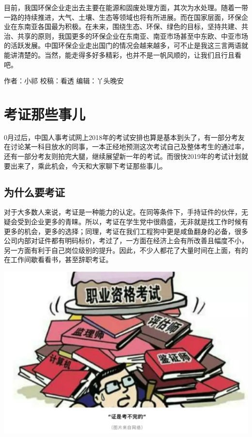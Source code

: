 \documentclass[]{book}
\begin{document}
目前，我国环保企业走出去主要在能源和固废处理方面，其次为水处理。随着一带一路的持续推进，大气、土壤、生态等领域也将有所进展。而在国家层面，环保企业在东南亚各国最为积极。在未来，围绕生态、环保、绿色的目标，坚持共建、共治、共享的原则，我国更多的环保企业在东南亚、南亚市场甚至中东欧、中亚市场的活跃发展。中国环保企业走出国门的情况会越来越多，可不止是我这三言两语就能讲清楚的。当然，能走得多好多精彩，也并不是一帆风顺的，让我们且行且看吧。

作者：小祁
校稿：看透
编辑：丫头晚安

\hypertarget{ux8003ux8bc1ux90a3ux4e9bux4e8bux513f}{%
\section{考证那些事儿}\label{ux8003ux8bc1ux90a3ux4e9bux4e8bux513f}}

0月过后，中国人事考试网上2018年的考试安排也算是基本到头了，有一部分考友在讨论某一科目放水的同事，一本正经地预测这次考试自己及整体考生的通过率，还有一部分考友则拍完大腿，继续展望新一年的考试。而很快2019年的考试计划就要出来了，乘此机会，今天和大家聊下考证那些事儿。

\hypertarget{ux4e3aux4ec0ux4e48ux8981ux8003ux8bc1}{%
\subsection{为什么要考证}\label{ux4e3aux4ec0ux4e48ux8981ux8003ux8bc1}}

对于大多数人来说，考证是一种能力的认定。在同等条件下，手持证件的伙伴，无疑会受到企业更多的青睐。所以，考证在学生党中很鼎盛，无非就是找工作时候有更多的机会，更多的选择；同理，考证在我们工程狗中更是咸鱼翻身的必备，很多公司内部对证件都有明码标价，考过了，一方面在经济上会有所改善且幅度不小，另一方面有利于自己岗位级别的提升。因此，不少人都花了大量时间在上面，有的在工作间歇看看书，甚至辞职考证。

\includegraphics[width=8.33in]{images/kaozheng1}
\end{document}
